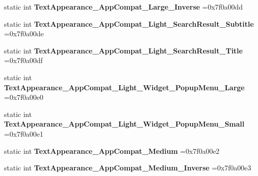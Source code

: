 \begin{DoxyCompactItemize}
static int {\bfseries Text\+Appearance\+\_\+\+App\+Compat\+\_\+\+Large\+\_\+\+Inverse} =0x7f0a00dd
\item 
\mbox{\label{classandroid_1_1support_1_1v7_1_1recyclerview_1_1R_1_1style_a0e3e7d36da61a26cbb6ece801d5464e9}} 
static int {\bfseries Text\+Appearance\+\_\+\+App\+Compat\+\_\+\+Light\+\_\+\+Search\+Result\+\_\+\+Subtitle} =0x7f0a00de
\item 
\mbox{\label{classandroid_1_1support_1_1v7_1_1recyclerview_1_1R_1_1style_a03272fa4b73ab0b32e3a186e69f4f957}} 
static int {\bfseries Text\+Appearance\+\_\+\+App\+Compat\+\_\+\+Light\+\_\+\+Search\+Result\+\_\+\+Title} =0x7f0a00df
\item 
\mbox{\label{classandroid_1_1support_1_1v7_1_1recyclerview_1_1R_1_1style_a830babebf756f62c093c0d79a84b1a2f}} 
static int {\bfseries Text\+Appearance\+\_\+\+App\+Compat\+\_\+\+Light\+\_\+\+Widget\+\_\+\+Popup\+Menu\+\_\+\+Large} =0x7f0a00e0
\item 
\mbox{\label{classandroid_1_1support_1_1v7_1_1recyclerview_1_1R_1_1style_abf966b3e5a9762116247d31479384b59}} 
static int {\bfseries Text\+Appearance\+\_\+\+App\+Compat\+\_\+\+Light\+\_\+\+Widget\+\_\+\+Popup\+Menu\+\_\+\+Small} =0x7f0a00e1
\item 
\mbox{\label{classandroid_1_1support_1_1v7_1_1recyclerview_1_1R_1_1style_ab5b3b64765de7b607e4d3fe44915a19b}} 
static int {\bfseries Text\+Appearance\+\_\+\+App\+Compat\+\_\+\+Medium} =0x7f0a00e2
\item 
\mbox{\label{classandroid_1_1support_1_1v7_1_1recyclerview_1_1R_1_1style_a98560d2a3a55586b4acf9aea5ded9e7e}} 
static int {\bfseries Text\+Appearance\+\_\+\+App\+Compat\+\_\+\+Medium\+\_\+\+Inverse} =0x7f0a00e3
\item 
\mbox{\label{classandroid_1_1support_1_1v7_1_1recyclerview_1_1R_1_1style_a22d320ca536c0c1695b260f768a05f2c}} 

\end{DoxyCompactItemize}
